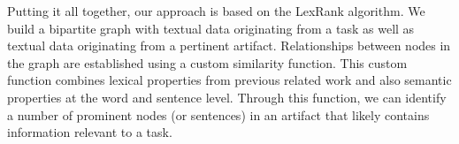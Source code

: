 





















Putting it all together, our approach is based on the LexRank algorithm.
We build a bipartite graph with textual data originating from a task as well as textual data originating from a pertinent artifact.
Relationships between nodes in the graph are established using a custom similarity function.
This custom function combines lexical properties from previous related work 
and also semantic properties at the word and sentence level.
Through this function, we can identify a number of prominent nodes (or sentences)
in an artifact that likely contains information relevant to a task.



